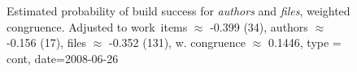 \begin{figure}[b]
\centering
{}

\caption{Estimated probability of build success for \emph{authors} and \emph{files}, weighted congruence. Adjusted to work~items $\approx$ -0.399 (34), authors $\approx$ -0.156 (17), files $\approx$ -0.352 (131), w. congruence $\approx$ 0.1446, type = cont, date=2008-06-26}
  \label{fig:weighted_congruence_authors_age}
\end{figure}



